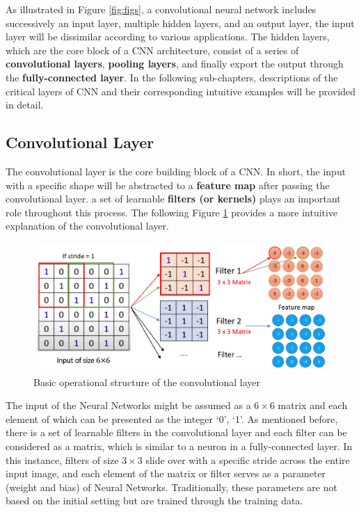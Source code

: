 \documentclass[]{krantz}
\begin{document}
As illustrated in Figure \ref{fig:figs}, a convolutional neural network includes successively an input layer, multiple hidden layers, and an output layer, the input layer will be dissimilar according to various applications. The hidden layers, which are the core block of a CNN architecture, consist of a series of \textbf{convolutional layers}, \textbf{pooling layers}, and finally export the output through the \textbf{fully-connected layer}. In the following sub-chapters, descriptions of the critical layers of CNN and their corresponding intuitive examples will be provided in detail.

\hypertarget{convolutional-layer}{%
\subsection{Convolutional Layer}\label{convolutional-layer}}

The convolutional layer is the core building block of a CNN. In short, the input with a specific shape will be abstracted to a \textbf{feature map} after passing the convolutional layer. a set of learnable \textbf{filters (or kernels)} plays an important role throughout this process. The following Figure \ref{fig:figs-2} provides a more intuitive explanation of the convolutional layer.

\begin{figure}[ht]

{\centering \includegraphics[width=0.65\linewidth]{figures/01-03-cnns-and-their-applications-in-nlp/Matrix} 

}

\caption{Basic operational structure of the convolutional layer}\label{fig:figs-2}
\end{figure}

The input of the Neural Networks might be assumed as a \(6\times6\) matrix and each element of which can be presented as the integer `0', `1'. As mentioned before, there is a set of learnable filters in the convolutional layer and each filter can be considered as a matrix, which is similar to a neuron in a fully-connected layer. In this instance, filters of size \(3 \times 3\) slide over with a specific stride across the entire input image, and each element of the matrix or filter serves as a parameter (weight and bias) of Neural Networks. Traditionally, these parameters are not based on the initial setting but are trained through the training data.
\end{document}
